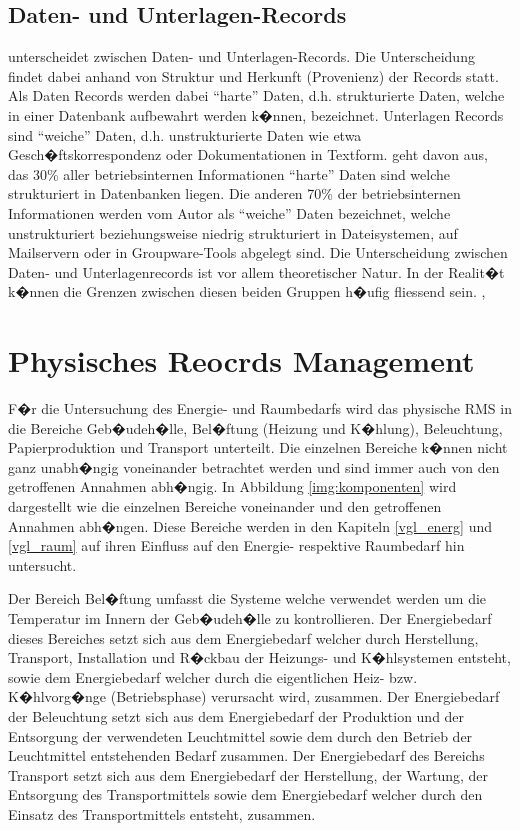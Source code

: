 \documentclass[a4paper,twoside,10pt]{report}
\begin{document}
\subsection{Daten- und Unterlagen-Records}
\citeauthor{rmHandbook} unterscheidet zwischen Daten- und Unterlagen-Records. Die Unterscheidung findet dabei anhand von Struktur und Herkunft (Provenienz) der Records statt. Als Daten Records werden dabei "`harte"' Daten, d.h. strukturierte Daten, welche in einer Datenbank aufbewahrt werden k�nnen, bezeichnet. Unterlagen Records sind "`weiche"' Daten, d.h. unstrukturierte Daten wie etwa Gesch�ftskorrespondenz oder Dokumentationen in Textform. \citeauthor{rmHandbook} geht davon aus, das 30\% aller betriebsinternen Informationen "`harte"' Daten sind welche strukturiert in Datenbanken liegen. Die anderen 70\% der betriebsinternen Informationen werden vom Autor als "`weiche"' Daten bezeichnet, welche unstrukturiert beziehungsweise niedrig strukturiert in Dateisystemen, auf Mailservern oder in Groupware-Tools abgelegt sind. Die Unterscheidung zwischen Daten- und Unterlagenrecords ist vor allem theoretischer Natur. In der Realit�t k�nnen die Grenzen zwischen diesen beiden Gruppen h�ufig fliessend sein. \cite{rmHandbook}, \cite{rmGest}



\section{Physisches Reocrds Management}\label{sec:physisch}
 
F�r die Untersuchung des Energie- und Raumbedarfs wird das physische \ac{RMS} in die Bereiche Geb�udeh�lle, Bel�ftung (Heizung und K�hlung), Beleuchtung, Papierproduktion und Transport unterteilt. Die einzelnen Bereiche k�nnen nicht ganz unabh�ngig voneinander betrachtet werden und sind immer auch von den getroffenen Annahmen abh�ngig. In Abbildung \ref{img:komponenten} wird dargestellt wie die einzelnen Bereiche voneinander und den getroffenen Annahmen abh�ngen. Diese Bereiche werden in den Kapiteln \ref{vgl_energ} und \ref{vgl_raum} auf ihren Einfluss auf den Energie- respektive Raumbedarf hin untersucht.

Der Bereich Bel�ftung umfasst die Systeme welche verwendet werden um die Temperatur im Innern der Geb�udeh�lle zu kontrollieren. Der Energiebedarf dieses Bereiches setzt sich aus dem Energiebedarf welcher durch Herstellung, Transport, Installation und R�ckbau der Heizungs- und K�hlsystemen entsteht, sowie dem Energiebedarf welcher durch die eigentlichen Heiz- bzw. K�hlvorg�nge (Betriebsphase) verursacht wird, zusammen. Der Energiebedarf der Beleuchtung setzt sich aus dem Energiebedarf der Produktion und der Entsorgung der verwendeten Leuchtmittel sowie dem durch den Betrieb der Leuchtmittel entstehenden Bedarf zusammen. Der Energiebedarf des Bereichs Transport setzt sich aus dem Energiebedarf der Herstellung, der Wartung, der Entsorgung des Transportmittels sowie dem Energiebedarf welcher durch den Einsatz des Transportmittels entsteht, zusammen.
\end{document}
